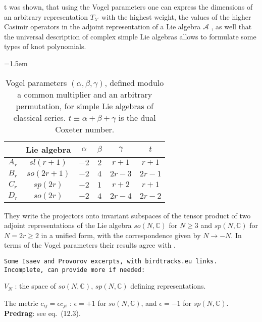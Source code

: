 \begin{description}
[... I]t was shown, that using the Vogel
parameters one can express the dimensions of an arbitrary representation
$T_{\lambda'}$ with the highest weight, the values of the
higher Casimir operators in the adjoint representation of a Lie algebra
$\mathcal{A}$ \cite{MkSeVe12}, as well that
the universal description of complex simple Lie algebras allows to
formulate some types of knot polynomials.

\begin{table}
\small
\centering
\caption{\label{IsaPro20:tab3}
Vogel parameters $(\alpha,\beta,\gamma)$, defined modulo a common
multiplier and an arbitrary permutation, for simple Lie algebras of
classical series. $t\equiv \alpha+\beta+\gamma$ is the
dual Coxeter number.}
\vspace*{1mm}\tabcolsep=1.5em
\renewcommand{\arraystretch}{1.2}
\begin{tabular}{|c|c|c|c|c|c|}
\hline
      & Lie algebra & $\alpha$ & $\beta$ & $\gamma$ & $t$\\
\hline
$A_r$ & $sl(r+1)$ & $-2$ & $2$ & $r+1$ & $r+1$\\
\hline
$B_r$ & $so(2r+1)$ & $-2$ & $4$ & $2r-3$ & $2r-1$\\
\hline
$C_r$ & $sp(2r)$ & $-2$ & $1$ & $r+2$ & $r+1$\\
\hline
$D_r$ & $so(2r)$ & $-2$ & $4$ & $2r-4$ & $2r-2$\\
\hline
\end{tabular}
\end{table}


They write the projectors onto invariant subspaces of the tensor product
of two adjoint representations of the Lie algebra $so(N,\mathbb{C})$ for
$N\ge 3$ and $sp(N,\mathbb{C})$ for $N=2r\ge 2$ in a unified form, with
the correspondence given by $N\to -N$. In terms of the Vogel parameters
their results agree with .
\bigskip

\item[2021-01-02 Predrag]
\texttt{Some Isaev and Provorov excerpts, with birdtracks.eu links.
Incomplete, can provide more if needed:}

$V_N$ : the space of $so(N,\mathbb{C})$, $sp(N,\mathbb{C})$ defining
representations.

The metric $c_{ij}=\epsilon c_{ji}$ : $\epsilon=+1$
for $so(N,\mathbb{C})$, and $\epsilon=-1$ for $sp(N,\mathbb{C})$.
\\{\bf Predrag}: see
 {eq.~(12.3)}.


\end{description}
